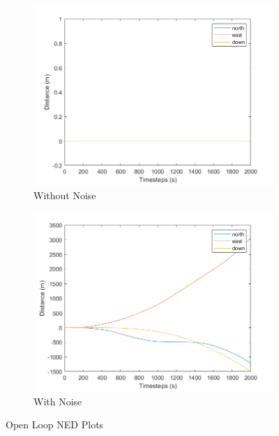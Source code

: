 \documentclass{article}
\begin{document}
\begin{figure}[h]
\centering
\begin{subfigure}{.5\textwidth}
  \centering
  \includegraphics[width=.95\linewidth]{open_loop}
  \caption{Without Noise}
  \label{fig:sub1}
\end{subfigure}%
\begin{subfigure}{.5\textwidth}
  \centering
  \includegraphics[width=.95\linewidth]{open_loop_noise}
  \caption{With Noise}
  \label{fig:sub2}
\end{subfigure}
\caption{Open Loop NED Plots}
\label{fig:test}
\end{figure}

\end{document}
